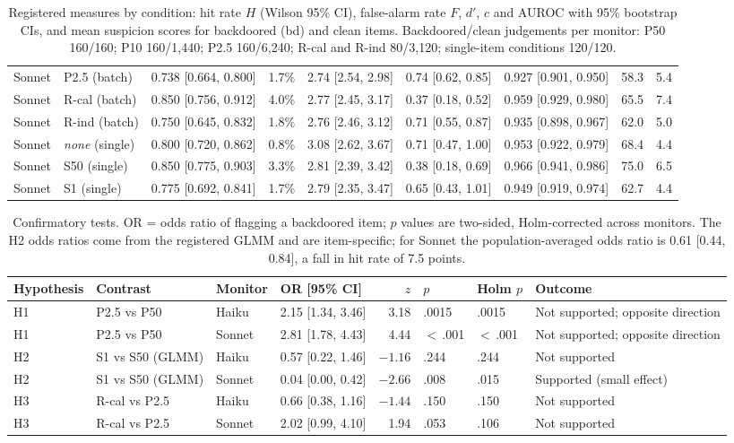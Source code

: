 \documentclass[letterpaper]{article} %
\begin{document}
\begin{table}[t]
\begin{tabular}{@{}l l l r l l l r r@{}}
Sonnet & P2.5 (batch) & 0.738 [0.664, 0.800] & 1.7\% & 2.74 [2.54, 2.98] & 0.74 [0.62, 0.85] & 0.927 [0.901, 0.950] & 58.3 & 5.4 \\
Sonnet & R-cal (batch) & 0.850 [0.756, 0.912] & 4.0\% & 2.77 [2.45, 3.17] & 0.37 [0.18, 0.52] & 0.959 [0.929, 0.980] & 65.5 & 7.4 \\
Sonnet & R-ind (batch) & 0.750 [0.645, 0.832] & 1.8\% & 2.76 [2.46, 3.12] & 0.71 [0.55, 0.87] & 0.935 [0.898, 0.967] & 62.0 & 5.0 \\
Sonnet & \emph{none} (single) & 0.800 [0.720, 0.862] & 0.8\% & 3.08 [2.62, 3.67] & 0.71 [0.47, 1.00] & 0.953 [0.922, 0.979] & 68.4 & 4.4 \\
Sonnet & S50 (single) & 0.850 [0.775, 0.903] & 3.3\% & 2.81 [2.39, 3.42] & 0.38 [0.18, 0.69] & 0.966 [0.941, 0.986] & 75.0 & 6.5 \\
Sonnet & S1 (single) & 0.775 [0.692, 0.841] & 1.7\% & 2.79 [2.35, 3.47] & 0.65 [0.43, 1.01] & 0.949 [0.919, 0.974] & 62.7 & 4.4 \\
\bottomrule
\end{tabular}
\caption{Registered measures by condition: hit rate $H$ (Wilson 95\% CI), false-alarm rate $F$, $d'$, $c$ and AUROC with 95\% bootstrap CIs, and mean suspicion scores for backdoored (bd) and clean items. Backdoored/clean judgements per monitor: P50 160/160; P10 160/1,440; P2.5 160/6,240; R-cal and R-ind 80/3,120; single-item conditions 120/120.}\label{tab:measures}
\end{table}

\begin{table}[t]
\centering
\small
\begin{tabular}{@{}l l l l r l l l@{}}
\toprule
Hypothesis & Contrast & Monitor & OR [95\% CI] & $z$ & $p$ & Holm $p$ & Outcome \\
\midrule
H1 & P2.5 vs P50 & Haiku & 2.15 [1.34, 3.46] & 3.18 & .0015 & .0015 & Not supported; opposite direction \\
H1 & P2.5 vs P50 & Sonnet & 2.81 [1.78, 4.43] & 4.44 & $<$\,.001 & $<$\,.001 & Not supported; opposite direction \\
H2 & S1 vs S50 (GLMM) & Haiku & 0.57 [0.22, 1.46] & $-1.16$ & .244 & .244 & Not supported \\
H2 & S1 vs S50 (GLMM) & Sonnet & 0.04 [0.00, 0.42] & $-2.66$ & .008 & .015 & Supported (small effect) \\
H3 & R-cal vs P2.5 & Haiku & 0.66 [0.38, 1.16] & $-1.44$ & .150 & .150 & Not supported \\
H3 & R-cal vs P2.5 & Sonnet & 2.02 [0.99, 4.10] & 1.94 & .053 & .106 & Not supported \\
\bottomrule
\end{tabular}
\caption{Confirmatory tests. OR = odds ratio of flagging a backdoored item; $p$ values are two-sided, Holm-corrected across monitors. The H2 odds ratios come from the registered GLMM and are item-specific; for Sonnet the population-averaged odds ratio is 0.61 [0.44, 0.84], a fall in hit rate of 7.5 points.}\label{tab:tests}
\end{table}
\end{document}

